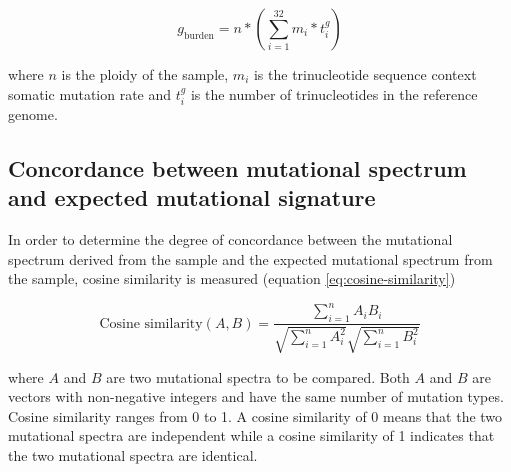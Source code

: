 \begin{equation} \label{eq:mutation-burden-per-cell}
g_{\text{burden}} = n * (\sum^{32}_{i=1} m_{i} * t^{g}_{i})
\end{equation}

where $n$ is the ploidy of the sample, $m_{i}$ is the trinucleotide sequence context somatic mutation rate and $t^{g}_{i}$ is the number of trinucleotides in the reference genome.

\subsection{Concordance between mutational spectrum and expected mutational signature}

In order to determine the degree of concordance between the mutational spectrum derived from the sample and the expected mutational spectrum from the sample, cosine similarity is measured (equation \ref{eq:cosine-similarity})

\begin{equation} 
\label{eq:cosine-similarity}
\text{Cosine similarity} (A,B) = \frac{\sum^{n}_{i=1}A_{i}B_{i}}{\sqrt{\sum^{n}_{i=1}A^{2}_{i}}\sqrt{\sum^{n}_{i=1}B^{2}_{i}}}
\end{equation}

where $A$ and $B$ are two mutational spectra to be compared. Both $A$ and $B$ are vectors with non-negative integers and have the same number of mutation types. Cosine similarity ranges from 0 to 1. A cosine similarity of 0 means that the two mutational spectra are independent while a cosine similarity of 1 indicates that the two mutational spectra are identical. 

